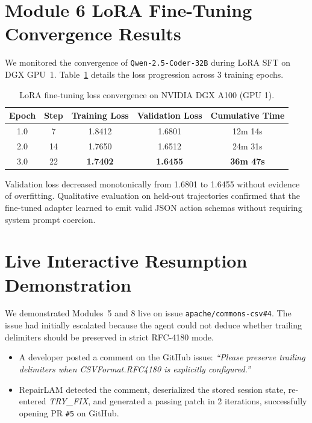 \documentclass[12pt,a4paper]{report}
\begin{document}
\section{Module 6 LoRA Fine-Tuning Convergence Results}
We monitored the convergence of \texttt{Qwen-2.5-Coder-32B} during LoRA SFT on DGX GPU~1. Table~\ref{tab:lora_convergence} details the loss progression across 3 training epochs.

\begin{table}[htbp]
\centering
\caption{LoRA fine-tuning loss convergence on NVIDIA DGX A100 (GPU 1).}
\label{tab:lora_convergence}
\begin{tabular}{c c c c c}
\toprule
\textbf{Epoch} & \textbf{Step} & \textbf{Training Loss} & \textbf{Validation Loss} & \textbf{Cumulative Time} \\
\midrule
1.0 & 7 & 1.8412 & 1.6801 & 12m 14s \\
2.0 & 14 & 1.7650 & 1.6512 & 24m 31s \\
3.0 & 22 & \textbf{1.7402} & \textbf{1.6455} & \textbf{36m 47s} \\
\bottomrule
\end{tabular}
\end{table}

Validation loss decreased monotonically from 1.6801 to 1.6455 without evidence of overfitting. Qualitative evaluation on held-out trajectories confirmed that the fine-tuned adapter learned to emit valid JSON action schemas without requiring system prompt coercion.

\section{Live Interactive Resumption Demonstration}
We demonstrated Modules~5 and 8 live on issue \texttt{apache/commons-csv\#4}. The issue had initially escalated because the agent could not deduce whether trailing delimiters should be preserved in strict RFC-4180 mode. 
\begin{itemize}
    \item A developer posted a comment on the GitHub issue: \textit{``Please preserve trailing delimiters when CSVFormat.RFC4180 is explicitly configured.''}
    \item RepairLAM detected the comment, deserialized the stored session state, re-entered \textit{TRY\_FIX}, and generated a passing patch in 2 iterations, successfully opening PR \texttt{\#5} on GitHub.
\end{itemize}
\end{document}
